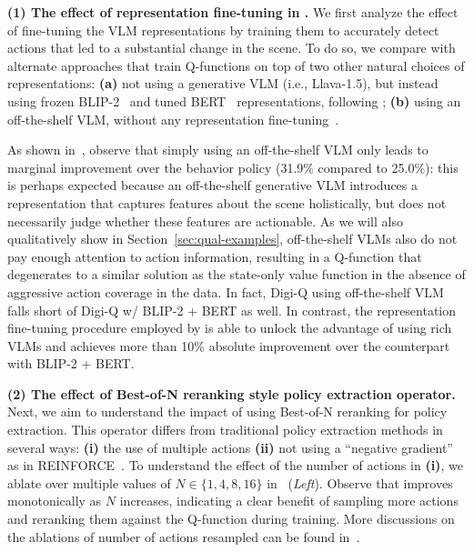 \textbf{(1) The effect of representation fine-tuning in \ourmethod{}.} We first analyze the effect of fine-tuning the VLM representations by training them to accurately detect actions that led to a substantial change in the scene. To do so, we compare \ourmethod{} with alternate approaches that train Q-functions on top of two other natural choices of representations: \textbf{(a)} not using a generative VLM (i.e., Llava-1.5), but instead using frozen BLIP-2~\citep{radford2021learningtransferablevisualmodels} and tuned BERT~\citep{devlin2019bertpretrainingdeepbidirectional} representations, following \citet{bai2024digirltraininginthewilddevicecontrol}; \textbf{(b)} using an off-the-shelf VLM, without any representation fine-tuning~\citep{chen2024visionlanguagemodelsprovidepromptable}. 

As shown in~, observe that simply using an off-the-shelf VLM only leads to marginal improvement over the behavior policy (31.9\% compared to 25.0\%): this is perhaps expected because an off-the-shelf generative VLM introduces a representation that captures features about the scene holistically, but does not necessarily judge whether these features are actionable. As we will also qualitatively show in Section~\ref{sec:qual-examples}, off-the-shelf VLMs also do not pay enough attention to action information, resulting in a Q-function that degenerates to a similar solution as the state-only value function in the absence of aggressive action coverage in the data. In fact, Digi-Q using off-the-shelf VLM falls short of Digi-Q w/ BLIP-2 + BERT as well. In contrast, the representation fine-tuning procedure employed by \ourmethod{} is able to unlock the advantage of using rich VLMs and achieves more than 10\% absolute improvement over the counterpart with BLIP-2 + BERT.


\textbf{(2) The effect of Best-of-N reranking style policy extraction operator.} Next, we aim to understand the impact of using Best-of-N reranking for policy extraction. This operator differs from traditional policy extraction methods in several ways: \textbf{(i)} the use of multiple actions \textbf{(ii)} not using a ``negative gradient''~\citep{tajwar2024preferencefinetuningllmsleverage} as in REINFORCE~\citep{williams1992simpleREINFORCE}. To understand the effect of the number of actions in \textbf{(i)}, we ablate \ourmethod{} over multiple values of $N\in\{1, 4, 8, 16\}$ in~ (\textit{Left}). Observe that \ourmethod{} improves monotonically as $N$ increases, indicating a clear benefit of sampling more actions and reranking them against the Q-function during training. More discussions on the ablations of number of actions resampled can be found in~.

